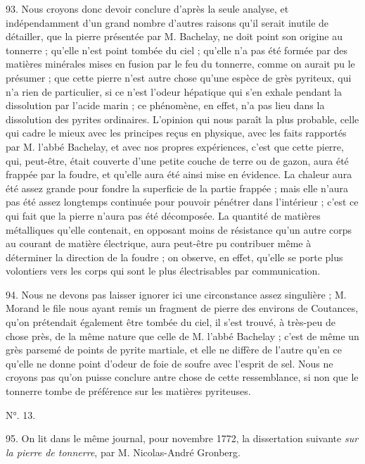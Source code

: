 \documentclass[a4paper, 11pt, oneside, polutonikogreek, french]{article}
\begin{document}
93. Nous croyons donc devoir conclure d'après la seule analyse, et indépendamment d'un grand nombre d'autres raisons qu'il serait inutile de détailler, que la pierre présentée par M. Bachelay, ne doit point son origine au tonnerre ; qu'elle n'est point tombée du ciel ; qu'elle n'a pas été formée par des matières minérales mises en fusion par le feu du tonnerre, comme on aurait pu le présumer ; que cette pierre n'est autre chose qu'une espèce de grès pyriteux, qui n'a rien de particulier, si ce n'est l'odeur hépatique qui s'en exhale pendant la dissolution par l'acide marin ; ce phénomène, en effet, n'a pas lieu dans la dissolution des pyrites ordinaires. L'opinion qui nous paraît la plus probable, celle qui cadre le mieux avec les principes reçus en physique, avec les faits rapportés par M. l'abbé Bachelay, et avec nos propres expériences, c'est que cette pierre, qui, peut-être, était couverte d'une petite couche de terre ou de gazon, aura été frappée par la foudre, et qu'elle aura été ainsi mise en évidence. La chaleur aura été assez grande pour fondre la superficie de la partie frappée ; mais elle n'aura pas été assez longtemps continuée pour pouvoir pénétrer dans l'intérieur ; c'est ce qui fait que la pierre n'aura pas été décomposée. La quantité de matières métalliques qu'elle contenait, en opposant moins de résistance qu'un autre corps au courant de matière électrique, aura peut-être pu contribuer même à déterminer la direction de la foudre ; on observe, en effet, qu'elle se porte plus volontiers vers les corps qui sont le plus électrisables par communication.

94. Nous ne devons pas laisser ignorer ici une circonstance assez singulière ; M. Morand le file nous ayant remis un fragment de pierre des environs de Coutances, qu'on prétendait également être tombée du ciel, il s'est trouvé, à très-peu de chose près, de la même nature que celle de M. l'abbé Bachelay ; c'est de même un grès parsemé de points de pyrite martiale, et elle ne diffère de l'autre qu'en ce qu'elle ne donne point d'odeur de foie de soufre avec l'esprit de sel. Nous ne croyons pas qu'on puisse conclure antre chose de cette ressemblance, si non que le tonnerre tombe de préférence sur les matières pyriteuses.

\begin{center}
N°. 13.
\end{center}

95. On lit dans le même journal, pour novembre 1772, la dissertation suivante \emph{sur la pierre de tonnerre}, par M. Nicolas-André Gronberg.
\end{document}
